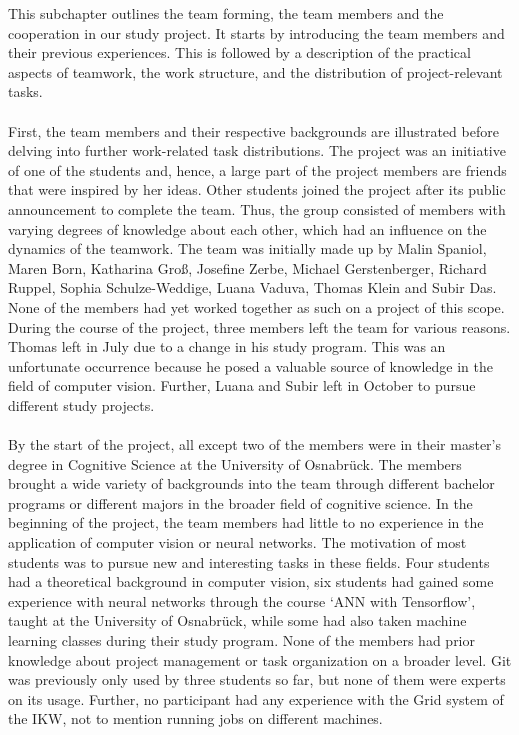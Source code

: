 This subchapter outlines the team forming, the team members and the cooperation in our study project. It starts by introducing the team members and their previous experiences. This is followed by a description of the practical aspects of teamwork, the work structure, and the distribution of project-relevant tasks. \\
\\
First, the team members and their respective backgrounds are illustrated before delving into further work-related task distributions.
The project was an initiative of one of the students and, hence, a large part of the project members are friends that were inspired by her ideas. Other students joined the project after its public announcement to complete the team. Thus, the group consisted of members with varying degrees of knowledge about each other, which had an influence on the dynamics of the teamwork. The team was initially made up by Malin Spaniol, Maren Born, Katharina Groß, Josefine Zerbe, Michael Gerstenberger, Richard Ruppel, Sophia Schulze-Weddige, Luana Vaduva, Thomas Klein and Subir Das. None of the members had yet worked together as such on a project of this scope. During the course of the project, three members left the team for various reasons. Thomas left in July due to a change in his study program. This was an unfortunate occurrence because he posed a valuable source of knowledge in the field of computer vision. Further, Luana and Subir left in October to pursue different study projects. \\
\\
By the start of the project, all except two of the members were in their master’s degree in Cognitive Science at the University of Osnabrück. The members brought a wide variety of backgrounds into the team through different bachelor programs or different majors in the broader field of cognitive science.
In the beginning of the project, the team members had little to no experience in the application of computer vision or neural networks. The motivation of most students was to pursue new and interesting tasks in these fields. Four students had a theoretical background in computer vision, six students had gained some experience with neural networks through the course ‘ANN with Tensorflow’, taught at the University of Osnabrück, while some had also taken machine learning classes during their study program. None of the members had prior knowledge about project management or task organization on a broader level. Git was previously only used by three students so far, but none of them were experts on its usage. Further, no participant had any experience with the Grid system of the IKW, not to mention running jobs on different machines.
